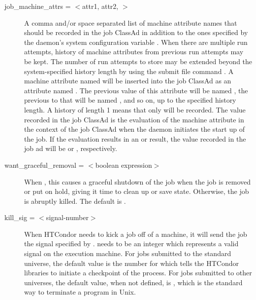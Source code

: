 \begin{description}

\label{condor-submit-job-machine-attrs}
\item[job\_machine\_attrs = $<$attr1, attr2, \Dots $>$]
A comma and/or space separated list of machine attribute names that
should be recorded in the job ClassAd in addition to the ones specified
by the  daemon's system configuration variable
.  When there are multiple run
attempts, history of machine attributes from previous run attempts
may be kept.  The number of run attempts to store may be extended
beyond the system-specified history length by using the submit file
command .  A machine
attribute named  will be inserted into the job ClassAd as an
attribute named .  The previous value of this
attribute will be named , the previous to that
will be named , and so on, up to the specified
history length.  A history of length 1 means that only 
will be recorded.  The value recorded in the job ClassAd is the evaluation
of the machine attribute in the context of the job ClassAd when
the  daemon initiates the start up of the job.  If the
evaluation results in an  or  result, the value
recorded in the job ad will be  or , respectively.


\label{condor-submit-want-graceful-removal}
\item[want\_graceful\_removal = $<$boolean expression$>$]
When , this causes a graceful shutdown of the job when the
job is removed or put on hold, giving it time to clean up or save state.
Otherwise, the job is abruptly killed.  The default is .


\label{condor-submit-kill-sig}
\item[kill\_sig = $<$signal-number$>$] When HTCondor needs to kick a job
off of a machine, it will send the job the signal specified by
.
 needs to be an integer which
represents a valid signal on the execution machine.  For jobs submitted
to the standard universe, the default value is the number for
\verb@SIGTSTP@ which tells the HTCondor libraries to initiate a checkpoint
of the process.  For jobs submitted to other universes,
the default value, when not defined,
is \verb@SIGTERM@, which is the standard way to terminate a program in Unix.  


\end{description}
